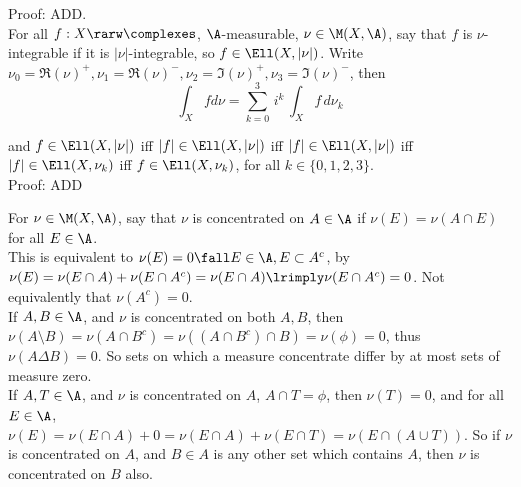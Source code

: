 \noindent
Proof: ADD. \\


For all $f:X \rarw \complexes$, $\A$-measurable, $\nu \in \M(X, \A)$, say that $f$ is $\nu$-integrable if it is $|\nu|$-integrable, so $f \in \Ell (X, |\nu|)$. Write $\nu_0 = \Re(\nu)^+, \nu_1 = \Re(\nu)^-, \nu_2 = \Im(\nu)^+, \nu_3 = \Im(\nu)^-$, then \\

$$
\int_X f d\nu = \sum_{k=0}^3 \, i^k \, \int_X f \, d\nu_k
$$

\noindent
and $f \in \Ell (X, |\nu|)$ iff $|f| \in \Ell (X, |\nu|)$ iff $|f| \in \Ell (X, |\nu|)$ iff $|f| \in \Ell (X, \nu_k)$ iff $f \in \Ell (X, \nu_k)$, for all $k \in \{0,1,2,3\}$. \\

\noindent
Proof: ADD \\





\break

For $\nu \in \M(X, \A)$, say that $\nu$ is concentrated on $A \in \A$ if $\nu(E) = \nu(A \cap E)$ for all $E \in \A$. \\

\noindent
This is equivalent to $\nu(E) = 0 \fall E \in \A, E \subset A^c$, by $\nu(E) = \nu(E \cap A) + \nu( E \cap A^c) = \nu(E \cap A) \lrimply \nu( E \cap A^c) = 0$.  Not equivalently that $\nu(A^c) = 0$. \\


\noindent
If $A,B \in \A$, and $\nu$ is concentrated on both $A,B$, then $\nu(A \setminus B) = \nu( A \cap B^c) = \nu( (A \cap B^c) \cap B ) = \nu( \phi ) = 0$, thus $\nu( A \Delta B) = 0$. So sets on which a measure concentrate differ by at most sets of measure zero. \\


\noindent
If $A,T \in \A$, and $\nu$ is concentrated on $A$, $A \cap T = \phi$, then $\nu(T) = 0$, and for all $E \in \A$, $\nu(E) = \nu(E \cap A) + 0 = \nu(E \cap A) + \nu(E \cap T) = \nu(E \cap (A \cup T))$. So if $\nu$ is concentrated on $A$, and $B \in A$ is any other set which contains $A$, then $\nu$ is concentrated on $B$ also. \\


